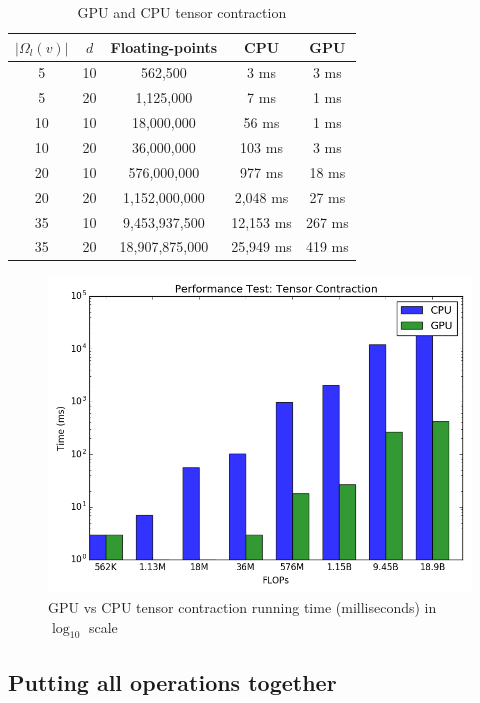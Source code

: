 \documentclass[a4paper]{article}
\begin{document}
\begin{table}
\caption{GPU and CPU tensor contraction}\label{tab:tensor_contraction}
\begin{tabular}{|| c | c | c | c | c ||}
	\hline
	$|\Omega_l(v)|$ & $d$ & Floating-points & CPU & GPU \\
	\hline\hline
	5 & 10 & 562,500 & 3 ms & 3 ms \\
	\hline
	5 & 20 & 1,125,000 & 7 ms & 1 ms \\
	\hline
	10 & 10 & 18,000,000 & 56 ms & 1 ms \\
	\hline
	10 & 20 & 36,000,000 & 103 ms & 3 ms \\
	\hline
	20 & 10 & 576,000,000 & 977 ms & 18 ms \\
	\hline 
	20 & 20 & 1,152,000,000 & 2,048 ms & 27 ms \\
	\hline
	35 & 10 & 9,453,937,500 & 12,153 ms & 267 ms \\
	\hline
	35 & 20 & 18,907,875,000 & 25,949 ms & 419 ms \\
	\hline
\end{tabular}
\end{table}

\begin{figure}
\caption{GPU vs CPU tensor contraction running time (milliseconds) in $\log_{10}$ scale}\label{fig:tensor_contraction}
\includegraphics[width=\columnwidth]{Tensor_Contraction}
\end{figure} 


\subsection{Putting all operations together}
\end{document}
